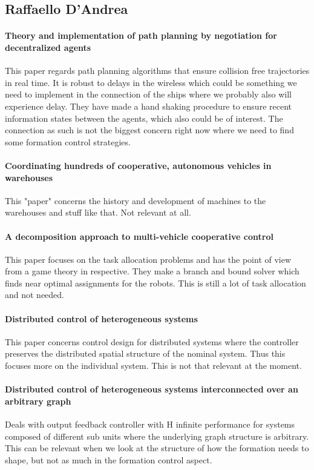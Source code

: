 \subsection{Raffaello D'Andrea}

\paragraph{Theory and implementation of path planning by negotiation for decentralized agents}
This paper regards path planning algorithms that ensure collision free trajectories in real time. It is robust to delays in the wireless which could be something we need to implement in the connection of the ships where we probably also will experience delay. They have made a hand shaking procedure to ensure recent information states between the agents, which also could be of interest.
The connection as such is not the biggest concern right now where we need to find some formation control strategies.

{\vskip0pt\color{gray}
\paragraph{Coordinating hundreds of cooperative, autonomous vehicles in warehouses}
This "paper" concerns the history and development of machines to the warehouses and stuff like that.
Not relevant at all.}

{\vskip0pt\color{gray}
\paragraph{A decomposition approach to multi-vehicle cooperative control}
This paper focuses on the task allocation problems and has the point of view from a game theory in respective. They make a branch and bound solver which finds near optimal assignments for the robots.
This is still a lot of task allocation and not needed.}

\paragraph{Distributed control of heterogeneous systems}
This paper concerns control design for distributed systems where the controller preserves the distributed spatial structure of the nominal system. Thus this focuses more on the individual system.
This is not that relevant at the moment.

\paragraph{Distributed control of heterogeneous systems interconnected over an arbitrary graph}
Deals with output feedback controller with H infinite performance for systems composed of different sub units where the underlying graph structure is arbitrary.
This can be relevant when we look at the structure of how the formation needs to shape, but not as much in the formation control aspect.

